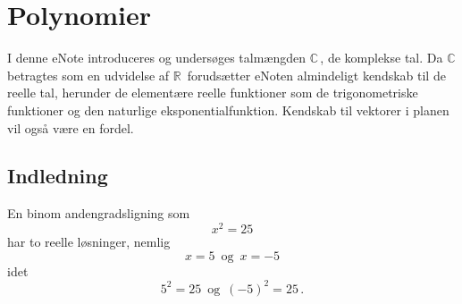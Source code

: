 
\setcounter{chapter}{29} %

\chapter{Polynomier} \label{tn29}






\begin{basis}
I denne eNote introduceres og undersøges talmængden $\mathbb C\,$, de komplekse tal. Da $\mathbb C\,$ betragtes som en udvidelse af $\mathbb R\,$ forudsætter eNoten almindeligt kendskab til de reelle tal, herunder de elementære reelle funktioner som de trigonometriske funktioner og den naturlige eksponentialfunktion. Kendskab til vektorer i planen vil også være en fordel.
\end{basis}

\section{Indledning}

En binom andengradsligning som
$$x^2=25$$
har to reelle løsninger, nemlig
$$x=5\,\,\,\mathrm{og}\,\,\,x=-5$$
idet
$$5^2=25\,\,\,\mathrm{og}\,\,\,(-5)^2=25\,.$$ 

 

